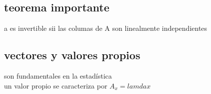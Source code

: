 \documentclass[10pt,a4paper]{article} %
\begin{document}
                \subsection{teorema importante}
                    a es invertible sii las columas de A son linealmente independientes
                
                \subsection{vectores y valores propios}
                    son fundamentales en la estadística 
                    \\ un valor propio se caracteriza por $ A_x = lamda x  $  
                
        
    







    
    \nocite{*}
    
    
\end{document}

